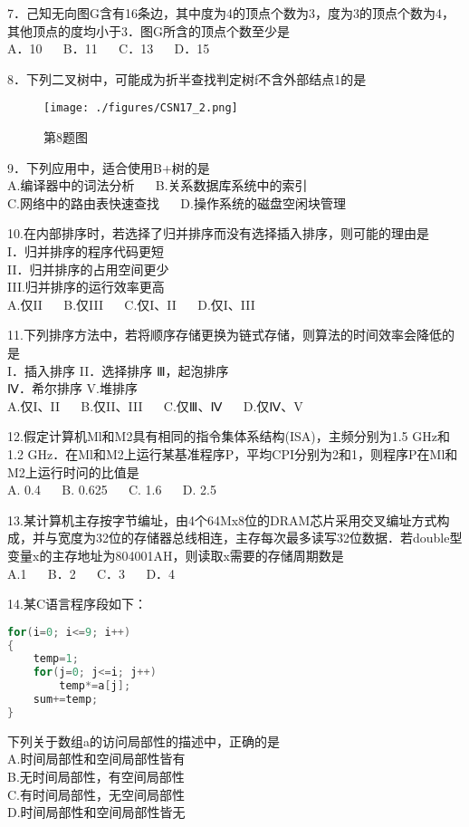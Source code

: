 7．己知无向图G含有16条边，其中度为4的顶点个数为3，度为3的顶点个数为4，其他顶点的度均小于3．图G所含的顶点个数至少是 \\
A．10  $\quad$  B．11  $\quad$  C．13  $\quad$  D．15

8．下列二叉树中，可能成为折半查找判定树f不含外部结点1的是 \\
\begin{figure}[ht]
\centering
\texttt{[image: ./figures/CSN17\_2.png]}
\caption{第8题图} \label{CSN17_fig2}
\end{figure}

9．下列应用中，适合使用B+树的是 \\
A.编译器中的词法分析 $\quad$ B.关系数据库系统中的索引 \\
C.网络中的路由表快速查找  $\quad$  D.操作系统的磁盘空闲块管理

10.在内部排序时，若选择了归并排序而没有选择插入排序，则可能的理由是 \\
I．归并排序的程序代码更短 \\
II．归并排序的占用空间更少 \\
III.归并排序的运行效率更高 \\
A.仅II  $\quad$  B.仅III  $\quad$  C.仅I、II  $\quad$  D.仅I、III

11.下列排序方法中，若将顺序存储更换为链式存储，则算法的时间效率会降低的是 \\
I．插入排序    II．选择排序  Ⅲ，起泡排序 \\
Ⅳ．希尔排序    V.堆排序 \\
A.仅I、II $\quad$ B.仅II、III  $\quad$  C.仅Ⅲ、Ⅳ  $\quad$  D.仅Ⅳ、V

12.假定计算机Ml和M2具有相同的指令集体系结构(ISA)，主频分别为1.5 GHz和1.2 GHz．在Ml和M2上运行某基准程序P，平均CPI分别为2和1，则程序P在Ml和M2上运行时问的比值是 \\
A. 0.4  $\quad$  B. 0.625  $\quad$  C. 1.6  $\quad$  D. 2.5

13.某计算机主存按字节编址，由4个64Mx8位的DRAM芯片采用交叉编址方式构成，并与宽度为32位的存储器总线相连，主存每次最多读写32位数据．若double型变量x的主存地址为804001AH，则读取x需要的存储周期数是 \\
A.1  $\quad$  B．2  $\quad$  C．3  $\quad$  D．4

14.某C语言程序段如下： \\
\begin{lstlisting}[language=cpp]
for(i=0; i<=9; i++)
{
    temp=1;
    for(j=0; j<=i; j++)
        temp*=a[j];
    sum+=temp;
}
\end{lstlisting}
下列关于数组a的访问局部性的描述中，正确的是 \\
A.时间局部性和空间局部性皆有 \\
B.无时间局部性，有空间局部性 \\
C.有时间局部性，无空间局部性 \\
D.时间局部性和空间局部性皆无

